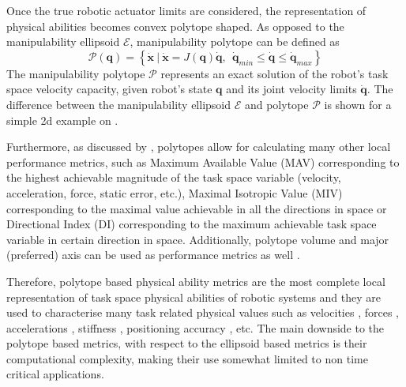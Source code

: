 Once the true robotic actuator limits are considered, the representation of physical abilities becomes convex polytope shaped. As opposed to the manipulability ellipsoid $\mathcal{E}$, manipulability polytope can be defined as
\begin{equation}
    \mathcal{P}(\bm{q}) = \left\{ \dot{\bm{x}} ~|~ \dot{\bm{x}} = J(\bm{q})\dot{\bm{q}},~~ \dot{\bm{q}}_{min}\leq\dot{\bm{q}} \leq \dot{\bm{q}}_{max} \right\}
\end{equation}
The manipulability polytope $\mathcal{P}$ represents an exact solution of the robot's task space velocity capacity, given robot's state $\bm{q}$
and its joint velocity limits $\dot{\bm{q}}$. The difference between the manipulability ellipsoid $\mathcal{E}$ and polytope $\mathcal{P}$ is shown for a simple 2d example on .

Furthermore, as discussed by \citet{Finotello1998}, polytopes allow for calculating many other local performance metrics, such as Maximum Available Value (MAV) corresponding to the highest achievable magnitude of the task space variable (velocity, acceleration, force, static error, etc.), Maximal Isotropic Value (MIV) corresponding to the maximal value achievable in all the directions in space or Directional Index (DI) \cite{boschetti_minto_2023} corresponding to the maximum achievable task space variable in certain direction in space. Additionally, polytope volume and major (preferred) axis can be used as performance metrics as well \cite{chiacchio_global_1991, Long2018Evaluating}.

Therefore, polytope based physical ability metrics are the most complete local representation of task space physical abilities of robotic systems and they are used to characterise many task related physical values such as velocities \cite{Lee1997manip, long_constrained_2020}, forces \cite{chiacchio_evaluation_1996}, accelerations \cite{chiacchio_2000}, stiffness \cite{ajoudani2015role}, positioning accuracy \cite{pholsiri2005real}, etc.
The main downside to the polytope based metrics, with respect to the ellipsoid based metrics is their computational complexity, making their use somewhat limited to non time critical applications.

